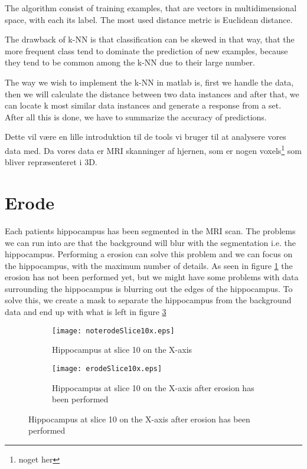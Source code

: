The algorithm consist of training examples, that are vectors in multidimensional space, with each its label. The most used distance metric is Euclidean distance.

The drawback of k-NN is that classification can be skewed in that way, that the more frequent class tend to dominate the prediction of new examples, because they tend to be common among the k-NN due to their large number.

The way we wish to implement the k-NN in matlab is, first we handle the data, then we will calculate the distance between two data instances and after that, we can locate k most similar data instances and generate a response from a set. After all this is done, we have to summarize the accuracy of predictions.


Dette vil være en lille introduktion til de tools vi bruger til at analysere vores data med. Da vores data er MRI skanninger af hjernen, som er nogen voxels\footnote{noget her} som bliver repræsenteret i 3D.\\



\section{Erode}

Each patients hippocampus has been segmented in the MRI scan. The problems we can run into are that the background will blur with the segmentation i.e. the hippocampus. Performing a erosion can solve this problem and we can focus on the hippocampus, with the maximum number of details. As seen in figure \ref{fig:noterodeslice} the erosion has not been performed yet, but we might have some problems with data surrounding the hippocampus is blurring out the edges of the hippocampus. To solve this, we create a mask to separate the hippocampus from the background data and end up with what is left in figure \ref{fig:erodeslice}

\begin{figure}[H]
\begin{subfigure}{.5\textwidth}
  \centering
  \texttt{[image: noterodeSlice10x.eps]}
  \caption{Hippocampus at slice 10 on the X-axis}\label{fig:noterodeslice}
\end{subfigure}
\begin{subfigure}{.5\textwidth}
  \centering
  \texttt{[image: erodeSlice10x.eps]}
  \caption{Hippocampus at slice 10 on the X-axis after erosion has been performed}\label{fig:erodeslice}
\end{subfigure}
\end{figure}

